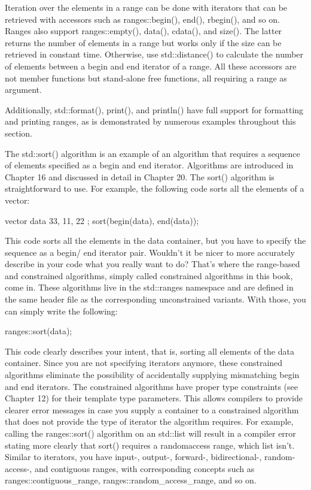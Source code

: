 Iteration over the elements in a range can be done with iterators that can be retrieved with accessors such as ranges::begin(), end(), rbegin(), and so on. Ranges also support ranges::empty(), data(), cdata(), and size(). The latter returns the number of elements in a range but works only if the size can be retrieved in constant time. Otherwise, use std::distance() to calculate the number of elements between a begin and end iterator of a range. All these accessors are not member functions but stand-alone free functions, all requiring a range as argument.

Additionally, std::format(), print(), and println() have full support for formatting and printing ranges, as is demonstrated by numerous examples throughout this section.


The std::sort() algorithm is an example of an algorithm that requires a sequence of elements specified as a begin and end iterator. Algorithms are introduced in Chapter 16 and discussed in detail in Chapter 20. The sort() algorithm is straightforward to use. For example, the following code sorts all the elements of a vector:

\begin{cpp}
vector data { 33, 11, 22 };
sort(begin(data), end(data));
\end{cpp}

This code sorts all the elements in the data container, but you have to specify the sequence as a begin/ end iterator pair. Wouldn’t it be nicer to more accurately describe in your code what you really want to do? That’s where the range-based and constrained algorithms, simply called constrained algorithms in this book, come in. These algorithms live in the std::ranges namespace and are defined in the same header file as the corresponding unconstrained variants. With those, you can simply write the following:

\begin{cpp}
ranges::sort(data);
\end{cpp}

This code clearly describes your intent, that is, sorting all elements of the data container. Since you are not specifying iterators anymore, these constrained algorithms eliminate the possibility of accidentally supplying mismatching begin and end iterators. The constrained algorithms have proper type constraints (see Chapter 12) for their template type parameters. This allows compilers to provide clearer error messages in case you supply a container to a constrained algorithm that does not provide the type of iterator the algorithm requires. For example, calling the ranges::sort() algorithm on an std::list will result in a compiler error stating more clearly that sort() requires a randomaccess range, which list isn’t. Similar to iterators, you have input-, output-, forward-, bidirectional-, random-access-, and contiguous ranges, with corresponding concepts such as ranges::contiguous\_range, ranges::random\_access\_range, and so on.

